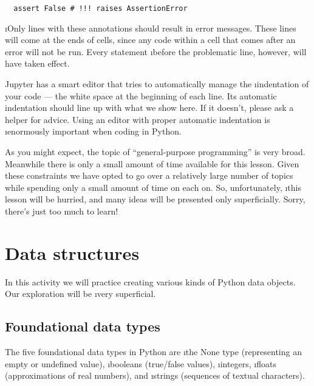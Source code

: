 \documentclass[letterpaper, 12pt, titlepage, twoside]{article}
\begin{document}
\begin{lstlisting}
  assert False # !!! raises AssertionError
\end{lstlisting}

\i{Only} lines with these annotations should result in error messages. These
lines will come at the ends of cells, since any code within a cell that comes
after an error will not be run. Every statement \i{before} the problematic
line, however, will have taken effect.

Jupyter has a smart editor that tries to automatically manage the
\i{indentation} of your code --- the white space at the beginning of each
line. Its automatic indentation should line up with what we show here. If it
doesn't, please ask a helper for advice. Using an editor with proper automatic
indentation is \i{enormously} important when coding in Python.

As you might expect, the topic of ``general-purpose programming'' is very
broad. Meanwhile there is only a small amount of time available for this
lesson. Given these constraints we have opted to go over a relatively large
number of topics while spending only a small amount of time on each on. So,
unfortunately, \i{this lesson will be hurried, and many ideas will be
  presented only superficially}. Sorry, there's just too much to learn!




\newpage
\section{Data structures}

In this activity we will practice creating various kinds of Python data
objects. Our exploration will be \i{very} superficial.

\subsection*{Foundational data types}

The five foundational data types in Python are \i{the None type} (representing
an empty or undefined value), \i{booleans} (true/false values), \i{integers},
\i{floats} (approximations of real numbers), and \i{strings} (sequences of
textual characters).
\end{document}
